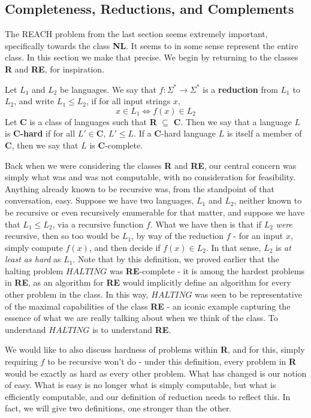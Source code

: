 \subsection{Completeness, Reductions, and Complements}
The REACH problem from the last section seems extremely important, specifically towards the class \textbf{NL}. It seems to in some sense represent the entire class. In this section we make that precise. We begin by returning to the classes \textbf{R} and \textbf{RE}, for inspiration.
\begin{definition}
    Let $L_1$ and $L_2$ be languages. We say that $f:\Sigma^* \to \Sigma^*$ is a \textbf{reduction} from $L_1$ to $L_2$, and write $L_1 \leq L_2$, if for all input strings $x$, 
    \[ x\in L_1 \iff f(x) \in L_2 \]
    Let \textbf{C} is a class of languages such that \textbf{R} $\subseteq$ \textbf{C}. Then we say that a language $L$ is \textbf{C-hard} if for all $L' \in \textbf{C}$, $L' \leq L$. If a \textbf{C}-hard language $L$ is itself a member of \textbf{C}, then we say that $L$ is \textbf{C}-complete. 
\end{definition}
Back when we were considering the classes \textbf{R} and \textbf{RE}, our central concern was simply what was and was not computable, with no consideration for feasibility. Anything already known to be recursive was, from the standpoint of that conversation, easy. Suppose we have two languages, $L_1$ and $L_2$, neither known to be recursive or even recursively enumerable for that matter, and suppose we have that $L_1 \leq L_2$, via a recursive function $f$. What we have then is that if $L_2$ \textit{were} recursive, then so too would be $L_1$, by way of the reduction $f$ - for an input $x$, simply compute $f(x)$, and then decide if $f(x) \in L_2$. In that sense, $L_2$ is \textit{at least as hard} as $L_1$. Note that by this definition, we proved earlier that the halting problem $HALTING$ was \textbf{RE}-complete - it is among the hardest problems in \textbf{RE}, as an algorithm for \textbf{RE} would implicitly define an algorithm for every other problem in the class. In this way, $HALTING$ was seen to be representative of the maximal capabilities of the class \textbf{RE} - an iconic example capturing the essence of what we are really talking about when we think of the class. To understand $HALTING$ is to understand \textbf{RE}.
\par We would like to also discuss hardness of problems within \textbf{R}, and for this, simply requiring $f$ to be recursive won't do - under this definition, every problem in \textbf{R} would be exactly as hard as every other problem. What has changed is our notion of easy. What is easy is no longer what is simply computable, but what is efficiently computable, and our definition of reduction needs to reflect this. In fact, we will give two definitions, one stronger than the other. 
